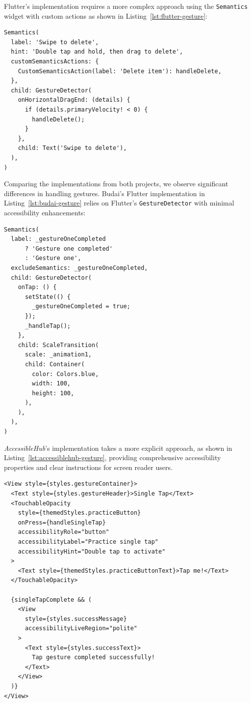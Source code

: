 Flutter's implementation requires a more complex approach using the \texttt{Semantics} widget with custom actions as shown in Listing~\ref{lst:flutter-gesture}:

\begin{lstlisting}[style=DartStyle, caption=Accessible gesture handler in Flutter, label=lst:flutter-gesture]
Semantics(
  label: 'Swipe to delete',
  hint: 'Double tap and hold, then drag to delete',
  customSemanticsActions: {
    CustomSemanticsAction(label: 'Delete item'): handleDelete,
  },
  child: GestureDetector(
    onHorizontalDragEnd: (details) {
      if (details.primaryVelocity! < 0) {
        handleDelete();
      }
    },
    child: Text('Swipe to delete'),
  ),
)
\end{lstlisting}

Comparing the implementations from both projects, we observe significant differences in handling gestures. Budai's Flutter implementation in Listing~\ref{lst:budai-gesture} relies on Flutter's \texttt{GestureDetector} with minimal accessibility enhancements:

\begin{lstlisting}[style=DartStyle, caption=Gesture handling in Budai's Flutter implementation, label=lst:budai-gesture]
Semantics(
  label: _gestureOneCompleted 
      ? 'Gesture one completed' 
      : 'Gesture one',
  excludeSemantics: _gestureOneCompleted,
  child: GestureDetector(
    onTap: () {
      setState(() {
        _gestureOneCompleted = true;
      });
      _handleTap();
    },
    child: ScaleTransition(
      scale: _animation1,
      child: Container(
        color: Colors.blue,
        width: 100,
        height: 100,
      ),
    ),
  ),
)
\end{lstlisting}

\pagebreak

\textit{AccessibleHub}'s implementation takes a more explicit approach, as shown in Listing~\ref{lst:accessiblehub-gesture}, providing comprehensive accessibility properties and clear instructions for screen reader users.

\begin{lstlisting}[style=ReactNativeStyle, caption=Gesture handling in AccessibleHub's React Native implementation, label=lst:accessiblehub-gesture]
<View style={styles.gestureContainer}>
  <Text style={styles.gestureHeader}>Single Tap</Text>
  <TouchableOpacity
    style={themedStyles.practiceButton}
    onPress={handleSingleTap}
    accessibilityRole="button"
    accessibilityLabel="Practice single tap"
    accessibilityHint="Double tap to activate"
  >
    <Text style={themedStyles.practiceButtonText}>Tap me!</Text>
  </TouchableOpacity>
  
  {singleTapComplete && (
    <View 
      style={styles.successMessage} 
      accessibilityLiveRegion="polite"
    >
      <Text style={styles.successText}>
        Tap gesture completed successfully!
      </Text>
    </View>
  )}
</View>
\end{lstlisting}

